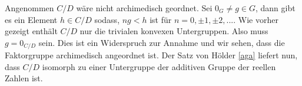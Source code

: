 {%
%
%
%
%
Angenommen $C/D$ wäre nicht archimedisch geordnet. Sei $0_G \neq g \in G$, dann gibt es ein Element $h\in C/D$ sodass, $ng < h$ ist für $n = 0, \pm 1,\pm 2, ...$. Wie vorher gezeigt enthält $C/D$ nur die trivialen konvexen Untergruppen. Also muss $g = 0_{C/D}$ sein. Dies ist ein Widerspruch zur Annahme und wir sehen, dass die Faktorgruppe archimedisch angeordnet ist.
Der Satz von Hölder \ref{aga} liefert nun, dass $C/D$ isomorph zu einer Untergruppe der additiven Gruppe der reellen Zahlen ist.
}
%
%
%
%
%
%
%
%
%

